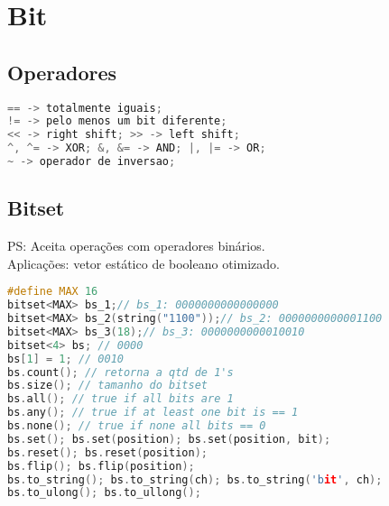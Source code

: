 \chapter{Bit}
\section{Operadores}
\begin{lstlisting}[language=C++, keywordstyle=\color{blue}]
== -> totalmente iguais;
!= -> pelo menos um bit diferente;
<< -> right shift; >> -> left shift;
^, ^= -> XOR; &, &= -> AND; |, |= -> OR;
~ -> operador de inversao;
\end{lstlisting}

\section{Bitset}
PS: Aceita operações com operadores binários.\\
Aplicações: vetor estático de booleano otimizado.
\begin{lstlisting}[language=C++]
#define MAX 16
bitset<MAX> bs_1;// bs_1: 0000000000000000
bitset<MAX> bs_2(string("1100"));// bs_2: 0000000000001100
bitset<MAX> bs_3(18);// bs_3: 0000000000010010
bitset<4> bs; // 0000
bs[1] = 1; // 0010
bs.count(); // retorna a qtd de 1's
bs.size(); // tamanho do bitset
bs.all(); // true if all bits are 1
bs.any(); // true if at least one bit is == 1
bs.none(); // true if none all bits == 0
bs.set(); bs.set(position); bs.set(position, bit);
bs.reset(); bs.reset(position);
bs.flip(); bs.flip(position);
bs.to_string(); bs.to_string(ch); bs.to_string('bit', ch);
bs.to_ulong(); bs.to_ullong();
\end{lstlisting}